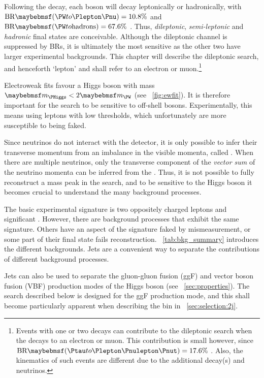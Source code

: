 
Following the \HWW decay, each \PW boson will decay leptonically or hadronically, with 
$\text{BR}\parenths{\HepProcess{\PW\HepTo\Plepton\Pnu}} = 10.8\%$ and 
$\text{BR}\parenths{\HepProcess{\PW\HepTo \text{hadrons}}} = 67.6\%$ \cite{PDG:2012}. 
Thus, \textit{dileptonic}, \textit{semi-leptonic} and \textit{hadronic} final states are 
conceivable. Although the dileptonic channel is suppressed by BRs, it is ultimately 
the most sensitive as the other two have larger experimental backgrounds. This chapter 
will describe the dileptonic search, and henceforth 
`lepton' and \Plepton shall refer to an electron or muon.\footnote{
	Events with one or two \HepProcess{\PW\HepTo\Ptau\Pnu} decays can 
	contribute to the dileptonic search when the \Ptau decays to an electron or muon. This 
	contribution is small however, since
	$\text{BR}\parenths{\HepProcess{\Ptau\HepTo\Plepton\Pnulepton\Pnut}} = 17.6\%$ 
	\cite{PDG:2012}. Also, the kinematics of such events are different due to the 
	additional decay(s) and neutrinos.
}

Electroweak fits favour a Higgs boson with mass $\mH < 2\mW$ (see \Figure~\ref{fig:ewfit}).
It is therefore important for the \HWW search to be sensitive to off-shell \PW bosons. 
Experimentally, this means using leptons with low \pt thresholds, which unfortunately 
are more susceptible to being faked.

Since neutrinos do not interact with the detector, it is only possible to infer their 
transverse momentum from an imbalance in the visible momenta, called \met. When there are 
multiple neutrinos, only the transverse component of the \textit{vector sum} of the neutrino 
momenta can be inferred from the \met. Thus, it is not possible to fully reconstruct a 
mass peak in the \HWWlvlv search, and to be sensitive to the Higgs boson it becomes 
crucial to understand the many background processes.

The basic experimental signature is two oppositely charged leptons and significant \met. 
However, there are background processes that exhibit the same signature. Others have an 
aspect of the signature faked by mismeasurement, or some part of their final state fails 
reconstruction. \Table~\ref{tab:bkg_summary} introduces the different backgrounds. Jets 
are a convenient way to separate the contributions of different background processes.

Jets can also be used to separate the gluon-gluon fusion (ggF) and vector boson fusion 
(VBF) production modes of the Higgs boson (see \Section~\ref{sec:properties}). The search 
described below is designed for the ggF production mode, and this shall become 
particularly apparent when describing the \twojet bin in \Section~\ref{sec:selection:2j}.

